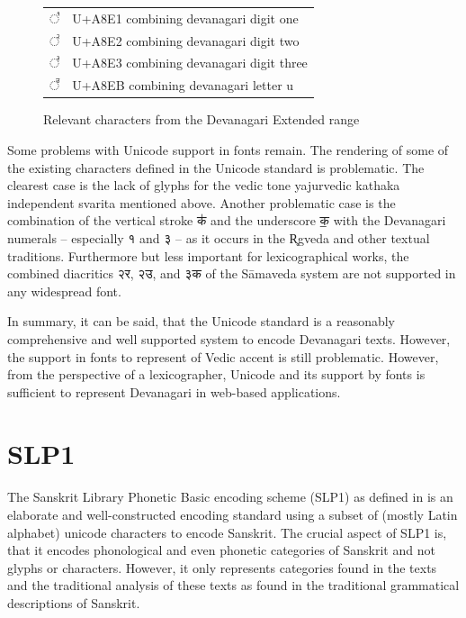 \begin{figure}[!ht]
\begin{center}
\begin{tabular}{ll}
	{\devfont ◌꣡	}& U+A8E1 {\sc combining devanagari digit one}\\
	{\devfont ◌꣢}& U+A8E2 {\sc combining devanagari digit two}\\
	{\devfont ◌꣣	}& U+A8E3 {\sc combining devanagari digit three}\\
	{\devfont ◌꣫	}& U+A8EB {\sc combining devanagari letter u}
\end{tabular}
\end{center}
\caption[Relevant characters from the Devanagari Extended range]{\label{tab:unidevext}Relevant characters from the Devanagari Extended range}
\end{figure}



Some problems with Unicode support in fonts remain. The rendering of some of the existing characters defined in the Unicode standard is problematic. The clearest case is the lack of glyphs for the {\sc vedic tone yajurvedic kathaka independent svarita} mentioned above. Another problematic case is the combination of the vertical stroke {\devfont क॑} and the underscore {\devfont क॒} with the Devanagari numerals – especially {\devfont १} and {\devfont ३} – as it occurs in the R̥gveda and other textual traditions. Furthermore but less important for lexicographical works, the combined diacritics {\devfont २र}, {\devfont २उ}, and {\devfont ३क} of the Sāmaveda system are not supported in any widespread font.

In summary, it can be said, that the Unicode standard is a reasonably comprehensive and well supported system to encode Devanagari texts. However, the support in fonts to represent of Vedic accent is still problematic. However, from the perspective of a lexicographer, Unicode and its support by fonts is sufficient to represent Devanagari in web-based applications.

\section{SLP1}

The Sanskrit Library Phonetic Basic encoding scheme (SLP1) as defined in \citet{ScharfHyman2011} is an elaborate and well-constructed encoding standard using a subset of (mostly Latin alphabet) unicode characters to encode Sanskrit. The crucial aspect of SLP1 is, that it encodes phonological and even phonetic categories of Sanskrit and not glyphs or characters. However, it only represents categories found in the texts and the traditional analysis of these texts as found in the traditional grammatical descriptions of Sanskrit.

